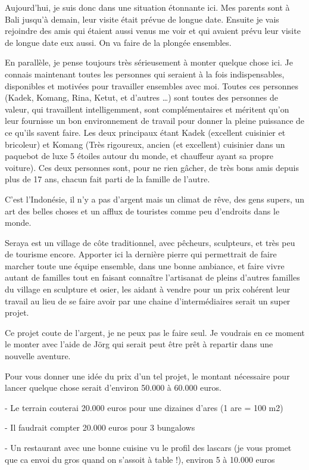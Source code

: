 \begin{multicols}{2}
Aujourd’hui, je suis donc dans une situation étonnante ici. Mes parents sont à Bali jusqu’à demain, leur visite était prévue de longue date. Ensuite je vais rejoindre des amis qui étaient aussi venus me voir et qui avaient prévu leur visite de longue date eux aussi. On va faire de la plongée ensembles.

En parallèle, je pense toujours très sérieusement à monter quelque chose ici. Je connais maintenant toutes les personnes qui seraient à la fois indispensables, disponibles et motivées pour travailler ensembles avec moi. Toutes ces personnes (Kadek, Komang, Rina, Ketut, et d’autres …) sont toutes des personnes de valeur, qui travaillent intelligemment, sont complémentaires et méritent qu’on leur fournisse un bon environnement de travail pour donner la pleine puissance de ce qu’ils savent faire. Les deux principaux étant Kadek (excellent cuisinier et bricoleur) et Komang (Très rigoureux, ancien (et excellent) cuisinier dans un paquebot de luxe 5 étoiles autour du monde, et chauffeur ayant sa propre voiture). Ces deux personnes sont, pour ne rien gâcher, de très bons amis depuis plus de 17 ans, chacun fait parti de la famille de l’autre.

C’est l’Indonésie, il n’y a pas d’argent mais un climat de rêve, des gens supers, un art des belles choses et un afflux de touristes comme peu d’endroits dans le monde.

Seraya est un village de côte traditionnel, avec pêcheurs, sculpteurs, et très peu de tourisme encore. Apporter ici la dernière pierre qui permettrait de faire marcher toute une équipe ensemble, dans une bonne ambiance, et faire vivre autant de familles tout en faisant connaître l’artisanat de pleins d’autres familles du village en sculpture et osier, les aidant à vendre pour un prix cohérent leur travail au lieu de se faire avoir par une chaine d’intermédiaires serait un super projet.

Ce projet coute de l’argent, je ne peux pas le faire seul. Je voudrais en ce moment le monter avec l’aide de Jörg qui serait peut être prêt à repartir dans une nouvelle aventure.

Pour vous donner une idée du prix d’un tel projet, le montant nécessaire pour lancer quelque chose serait d’environ 50.000 à 60.000 euros.

- Le terrain couterai 20.000 euros pour une dizaines d’ares (1 are = 100 m2)

- Il faudrait compter 20.000 euros pour 3 bungalows

- Un restaurant avec une bonne cuisine vu le profil des lascars (je vous promet que ca envoi du gros quand on s’assoit à table !), environ 5 à 10.000 euros


\end{multicols}
